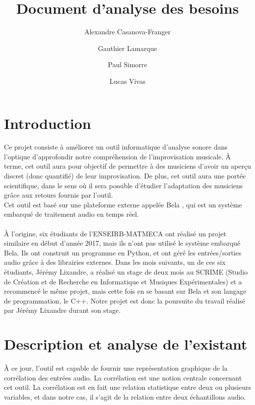 \documentclass{article}
\title{Document d'analyse des besoins}
\author{Alexandre Casanova-Franger\\
        \and
        Gauthier Lamarque\\
        \and
        Paul Simorre\\
        \and
        Lucas Vivas\\}
\begin{document}
\maketitle
\section{Introduction}
\paragraph{}
Ce projet consiste à améliorer un outil informatique d'analyse sonore dans
l'optique d'approfondir notre compréhension de l'improvisation musicale. À
terme, cet outil aura pour objectif de permettre à des musiciens d'avoir un
aperçu discret (donc quantifié) de leur improvisation. De plus, cet outil aura
une portée scientifique, dans le sens où il sera possible d'étudier l'adaptation
des musiciens grâce aux retours fournis par l'outil. \\
Cet outil est basé sur une plateforme externe appelée Bela \cite{BELA},
qui est un système embarqué de traitement audio en temps réel.
\paragraph{}
À l'origine, six étudiants de l'ENSEIRB-MATMECA ont réalisé un projet similaire
en début d'année 2017, mais ils n'ont pas utilisé le système embarqué Bela. Ils
ont construit un programme en Python, et ont géré les entrées/sorties audio
grâce à des librairies externes. Dans les mois suivants, un de ces six
étudiants, Jérémy Lixandre, a réalisé un stage de deux mois au SCRIME (Studio
de Création et de Recherche en Informatique et Musiques Expérimentales) et a
recommencé le même projet, mais cette fois en se basant sur Bela et son langage
de programmation, le C++. Notre projet est donc la poursuite du travail réalisé
par Jérémy Lixandre durant son stage.
\section{Description et analyse de l'existant}
\paragraph{}
À ce jour, l'outil est capable de fournir une représentation graphique de la
corrélation des entrées audio. La corrélation est une notion centrale
concernant cet outil. La corrélation est en fait une relation statistique
entre deux ou plusieurs variables, et dans notre cas, il s'agit de la
relation entre deux échantillons audio.
\end{document}
